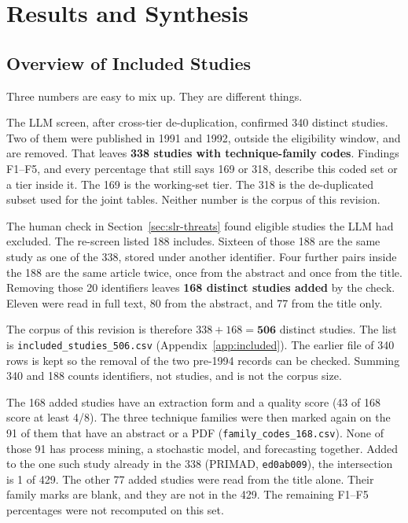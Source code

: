 \section{Results and Synthesis}
\label{sec:slr-synthesis}

\subsection{Overview of Included Studies}

Three numbers are easy to mix up. They are different things.

The LLM screen, after cross-tier de-duplication, confirmed 340 distinct
studies. Two of them were published in 1991 and 1992, outside the eligibility
window, and are removed. That leaves \textbf{338 studies with technique-family
codes}. Findings F1--F5, and every percentage that still says 169 or 318,
describe this coded set or a tier inside it. The 169 is the working-set tier.
The 318 is the de-duplicated subset used for the joint tables. Neither number
is the corpus of this revision.

The human check in Section~\ref{sec:slr-threats} found eligible studies the
LLM had excluded. The re-screen listed 188 includes. Sixteen of those 188 are
the same study as one of the 338, stored under another identifier. Four
further pairs inside the 188 are the same article twice, once from the
abstract and once from the title. Removing those 20 identifiers leaves
\textbf{168 distinct studies added} by the check. Eleven were read in full
text, 80 from the abstract, and 77 from the title only.

The corpus of this revision is therefore $338 + 168 = \textbf{506}$ distinct
studies. The list is \texttt{included\_studies\_506.csv}
(Appendix~\ref{app:included}). The earlier file of 340 rows is kept so the
removal of the two pre-1994 records can be checked. Summing 340 and 188
counts identifiers, not studies, and is not the corpus size.

The 168 added studies have an extraction form and a quality score (43 of 168
score at least 4/8). The three technique families were then marked again on
the 91 of them that have an abstract or a PDF
(\texttt{family\_codes\_168.csv}). None of those 91 has process mining,
a stochastic model, and forecasting together. Added to the one such study
already in the 338 (PRIMAD, \texttt{ed0ab009}), the intersection is 1 of 429.
The other 77 added studies were read from the title alone. Their family marks
are blank, and they are not in the 429. The remaining F1--F5 percentages
were not recomputed on this set.

